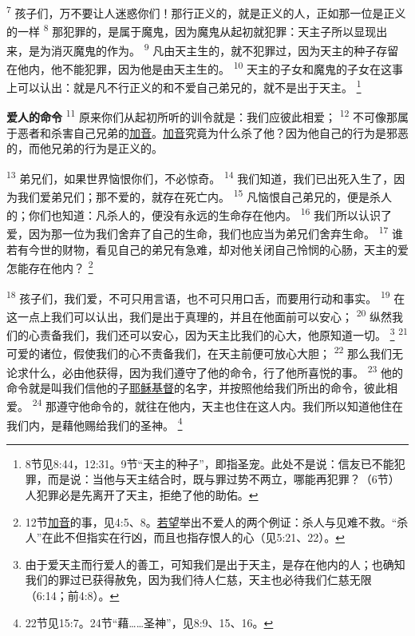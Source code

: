 \textsuperscript{7}
孩子们，万不要让人迷惑你们！那行正义的，就是正义的人，正如那一位是正义的一样
\textsuperscript{8}
那犯罪的，是属于魔鬼，因为魔鬼从起初就犯罪：天主子所以显现出来，是为消灭魔鬼的作为。
\textsuperscript{9}
凡由天主生的，就不犯罪过，因为天主的种子存留在他内，他不能犯罪，因为他是由天主生的。
\textsuperscript{10}
天主的子女和魔鬼的子女在这事上可以认出：就是凡不行正义的和不爱自己弟兄的，就不是出于天主。
\footnote{8节见8:44，12:31。9节“天主的种子”，即指圣宠。此处不是说：信友已不能犯罪，而是说：当他与天主结合时，既与罪过势不两立，哪能再犯罪？（6节）人犯罪必是先离开了天主，拒绝了他的助佑。}

\textbf{爱人的命令\quad}
\textsuperscript{11}
原来你们从起初所听的训令就是：我们应彼此相爱；
\textsuperscript{12}
不可像那属于恶者和杀害自己兄弟的\uline{加音}。\uline{加音}究竟为什么杀了他？因为他自己的行为是邪恶的，而他兄弟的行为是正义的。

\textsuperscript{13}
弟兄们，如果世界恼恨你们，不必惊奇。
\textsuperscript{14}
我们知道，我们已出死入生了，因为我们爱弟兄们；那不爱的，就存在死亡内。
\textsuperscript{15}
凡恼恨自己弟兄的，便是杀人的；你们也知道：凡杀人的，便没有永远的生命存在他内。
\textsuperscript{16}
我们所以认识了爱，因为那一位为我们舍弃了自己的生命，我们也应当为弟兄们舍弃生命。
\textsuperscript{17}
谁若有今世的财物，看见自己的弟兄有急难，却对他关闭自己怜悯的心肠，天主的爱怎能存在他内？
\footnote{12节\uline{加音}的事，见4:5、8。\uline{若望}举出不爱人的两个例证：杀人与见难不救。“杀人”在此不但指实在行凶，而且也指存恨人的心（见5:21、22）。}

\textsuperscript{18}
孩子们，我们爱，不可只用言语，也不可只用口舌，而要用行动和事实。
\textsuperscript{19}
在这一点上我们可以认出，我们是出于真理的，并且在他面前可以安心；
\textsuperscript{20}
纵然我们的心责备我们，我们还可以安心，因为天主比我们的心大，他原知道一切。
\footnote{由于爱天主而行爱人的善工，可知我们是出于天主，是存在他内的人；也确知我们的罪过已获得赦免，因为我们待人仁慈，天主也必待我们仁慈无限（6:14；前4:8）。}
\textsuperscript{21}
可爱的诸位，假使我们的心不责备我们，在天主前便可放心大胆；
\textsuperscript{22}
那么我们无论求什么，必由他获得，因为我们遵守了他的命令，行了他所喜悦的事。
\textsuperscript{23}
他的命令就是叫我们信他的子\uline{耶稣}\uline{基督}的名字，并按照他给我们所出的命令，彼此相爱。
\textsuperscript{24}
那遵守他命令的，就往在他内，天主也住在这人内。我们所以知道他住在我们内，是藉他赐给我们的圣神。
\footnote{22节见15:7。24节“藉……圣神”，见8:9、15、16。}

